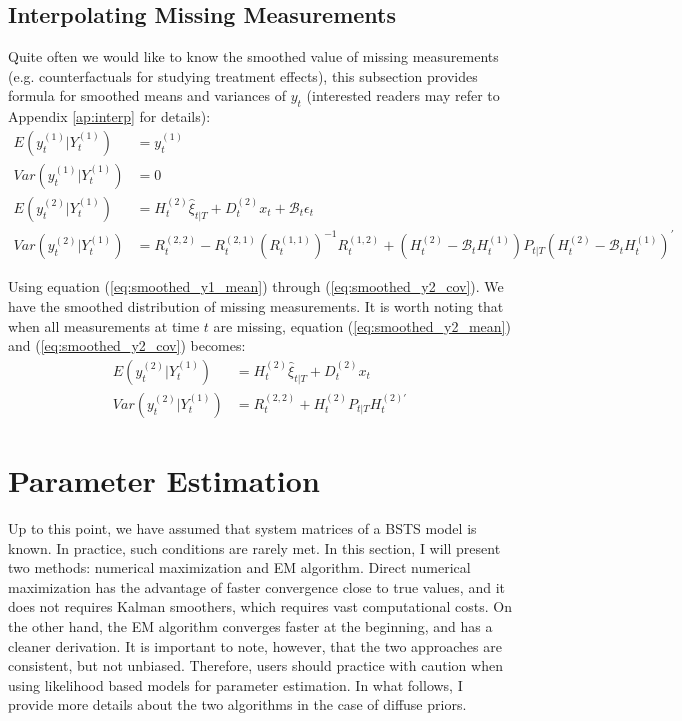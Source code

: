 \documentclass[10pt, titlepage]{article}
\numberwithin{equation}{section}
\begin{document}
\subsection{Interpolating Missing Measurements}
Quite often we would like to know the smoothed value of missing measurements (e.g. counterfactuals for studying treatment effects), this subsection provides formula for smoothed means and variances of $y_t$ (interested readers may refer to Appendix \ref{ap:interp} for details):
\begin{align}
    E(y_t^{(1)}|Y_t^{(1)}) &= y_t^{(1)} \label{eq:smoothed_y1_mean} \\
    Var(y_t^{(1)}|Y_t^{(1)}) &= 0 \\
    E(y_t^{(2)}|Y_t^{(1)}) &= H_t^{(2)}\hat{\xi}_{t|T} + D_t^{(2)}x_t + \mathcal{B}_t\epsilon_t \label{eq:smoothed_y2_mean} \\
    Var(y_t^{(2)}|Y_t^{(1)}) &= R_t^{(2, 2)} - R_t^{(2, 1)}\left(R_t^{(1, 1)}\right)^{-1}R_t^{(1, 2)} + 
        \left(H_t^{(2)}-\mathcal{B}_tH_t^{(1)}\right)P_{t|T}\left(H_t^{(2)}-\mathcal{B}_tH_t^{(1)}\right)^{'} \label{eq:smoothed_y2_cov}
\end{align}

Using equation (\ref{eq:smoothed_y1_mean}) through (\ref{eq:smoothed_y2_cov}). We have the smoothed distribution of missing measurements. It is worth noting that when all measurements at time $t$ are missing, equation (\ref{eq:smoothed_y2_mean}) and (\ref{eq:smoothed_y2_cov}) becomes:
\begin{align*}
    E(y_t^{(2)}|Y_t^{(1)}) &= H_t^{(2)}\hat{\xi}_{t|T} + D_t^{(2)}x_t \\
    Var(y_t^{(2)}|Y_t^{(1)}) &= R_t^{(2, 2)} + H_t^{(2)}P_{t|T}H_t^{(2)'} 
\end{align*}

\section{Parameter Estimation} \label{sec:param}
Up to this point, we have assumed that system matrices of a BSTS model is known. In practice, such conditions are rarely met. In this section, I will present two methods: numerical maximization and EM algorithm. Direct numerical maximization has the advantage of faster convergence close to true values, and it does not requires Kalman smoothers, which requires vast computational costs. On the other hand, the EM algorithm converges faster at the beginning, and has a cleaner derivation. It is important to note, however, that the two approaches are consistent, but not unbiased. Therefore, users should practice with caution when using likelihood based models for parameter estimation. In what follows, I provide more details about the two algorithms in the case of diffuse priors.
\end{document}
